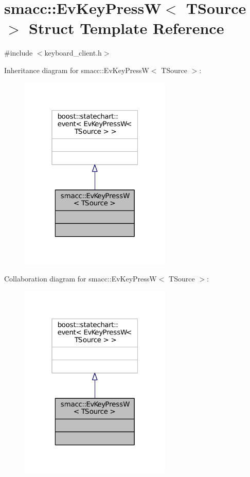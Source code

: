 \hypertarget{structsmacc_1_1EvKeyPressW}{}\section{smacc\+:\+:Ev\+Key\+PressW$<$ T\+Source $>$ Struct Template Reference}
\label{structsmacc_1_1EvKeyPressW}


{\ttfamily \#include $<$keyboard\+\_\+client.\+h$>$}



Inheritance diagram for smacc\+:\+:Ev\+Key\+PressW$<$ T\+Source $>$\+:
\nopagebreak
\begin{figure}[H]
\begin{center}
\leavevmode
\includegraphics[width=205pt]{structsmacc_1_1EvKeyPressW__inherit__graph}
\end{center}
\end{figure}


Collaboration diagram for smacc\+:\+:Ev\+Key\+PressW$<$ T\+Source $>$\+:
\nopagebreak
\begin{figure}[H]
\begin{center}
\leavevmode
\includegraphics[width=205pt]{structsmacc_1_1EvKeyPressW__coll__graph}
\end{center}
\end{figure}


